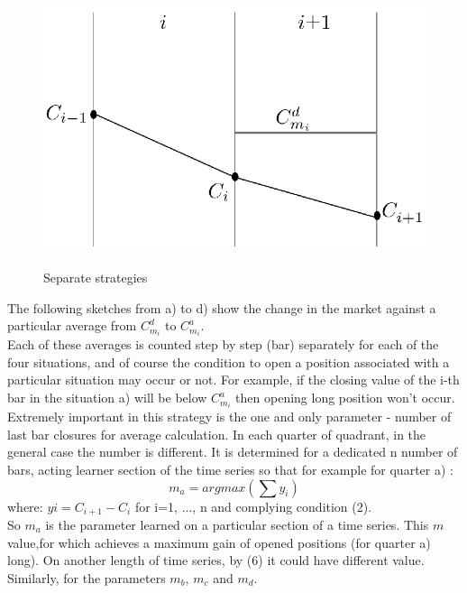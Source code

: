 \documentclass{tewiart}
\begin{document}
\begin{figure}[h]
\begin{minipage}{.49\linewidth}
\label{cztero}
\end{minipage}
\begin{minipage}{.49\linewidth}
\centering 
\includegraphics[width=\textwidth]{rysunek2d.eps}
\label{mansard}
\end{minipage}
\caption{Separate strategies}
\end{figure}
\FloatBarrier
\indent The following sketches from a) to d) show the change in the market against a particular average from $C^d_{m_{i}}$ to $C^a_{m_{i}}$.\\
\indent Each of these averages is counted step by step (bar) separately for each of the four situations, and of course the condition to open a position associated with a particular situation may occur or not. For example, if the closing value of the i-th bar in the situation a) will be below $C^a_{m_{i}}$ then opening long position won't occur.\\
\indent Extremely important in this strategy is the one and only parameter - number of last bar closures for average calculation. In each quarter of quadrant, in the general case the number is different. It is determined for a dedicated n number of bars, acting learner section of the time series so that for example for quarter a) :\\
\begin{equation}
	m_a = argmax (\sum y_i  )
\end{equation}
where: $yi = C_{i+1} - C_{i}$ for i=1, ..., n and complying  condition (2).\\
\indent So $m_{a}$ is the parameter learned on a particular section of a time series. This $m$ value,for which achieves a maximum gain of opened positions (for quarter a) long). On another length of time series, by (6) it could have different value. Similarly, for the parameters $m_{b}$, $m_{c}$ and $m_{d}$.\\
\end{document}
